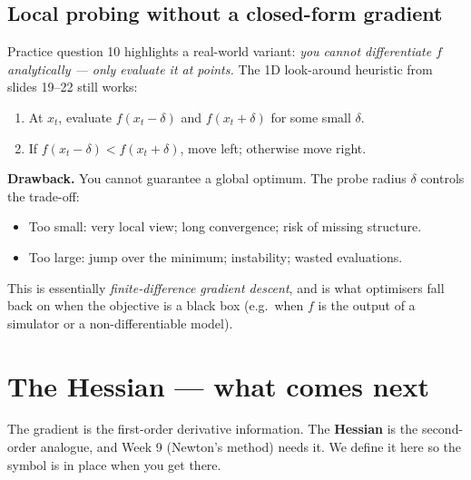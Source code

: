 \documentclass[11pt, a4paper]{article}
\begin{document}
\subsection{Local probing without a closed-form gradient}

Practice question 10 highlights a real-world variant: \emph{you cannot differentiate $f$ analytically — only evaluate it at points.} The 1D look-around heuristic from slides 19--22 still works:

\begin{enumerate}
  \item At $x_t$, evaluate $f(x_t - \delta)$ and $f(x_t + \delta)$ for some small $\delta$.
  \item If $f(x_t - \delta) < f(x_t + \delta)$, move left; otherwise move right.
\end{enumerate}

\textbf{Drawback.} You cannot guarantee a global optimum. The probe radius $\delta$ controls the trade-off:
\begin{itemize}
  \item Too small: very local view; long convergence; risk of missing structure.
  \item Too large: jump over the minimum; instability; wasted evaluations.
\end{itemize}
This is essentially \emph{finite-difference gradient descent}, and is what optimisers fall back on when the objective is a black box (e.g.\ when $f$ is the output of a simulator or a non-differentiable model).

\section{The Hessian — what comes next}

The gradient is the first-order derivative information. The \textbf{Hessian} is the second-order analogue, and Week 9 (Newton's method) needs it. We define it here so the symbol is in place when you get there.
\end{document}
